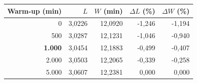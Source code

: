 \begin{tabular}{rrrrr}
\toprule
Warm-up (min) & $L$ & $W$ (min) & $\Delta L$ (\%) & $\Delta W$ (\%) \\
\midrule
0 & 3,0226 & 12,0920 & -1,246 & -1,194 \\
500 & 3,0287 & 12,1231 & -1,046 & -0,940 \\
\textbf{1.000} & 3,0454 & 12,1883 & -0,499 & -0,407 \\
2.000 & 3,0503 & 12,2065 & -0,339 & -0,258 \\
5.000 & 3,0607 & 12,2381 & 0,000 & 0,000 \\
\bottomrule
\end{tabular}
